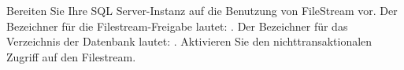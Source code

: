\item Bereiten Sie Ihre SQL Server-Instanz auf die Benutzung von FileStream vor.
Der Bezeichner für die Filestream-Freigabe lautet: . Der
Bezeichner für das Verzeichnis der Datenbank lautet:
. Aktivieren Sie den nichttransaktionalen Zugriff auf den
Filestream.
